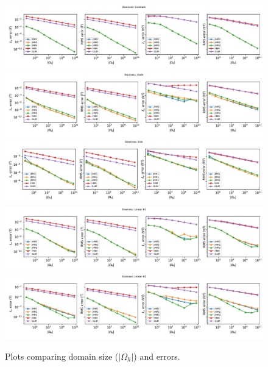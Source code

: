 \documentclass{siamart190516}
\begin{document}
\begin{figure}
  \includegraphics[width=\textwidth]{plots/size_vs_errors_1.pdf}
  \includegraphics[width=\textwidth]{plots/size_vs_errors_g.pdf}
  \includegraphics[width=\textwidth]{plots/size_vs_errors_m.pdf}
  \includegraphics[width=\textwidth]{plots/size_vs_errors_p.pdf}
  \includegraphics[width=\textwidth]{plots/size_vs_errors_v.pdf}
  \caption{Plots comparing domain size ($|\Omega_h|$) and
    errors.}\label{fig:size-vs-error}
\end{figure}
\end{document}

